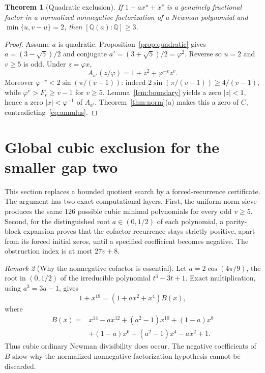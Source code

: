 \documentclass[11pt]{article}
\newtheorem{theorem}{Theorem}[section]
\theoremstyle{remark}
\newtheorem{remark}[theorem]{Remark}
\newcommand{\Q}{\mathbb Q}
\newcommand{\ph}{\varphi}
\numberwithin{equation}{section}
\begin{document}
\begin{theorem}[Quadratic exclusion]\label{thm:noquadratic}
If $1+a x^u+x^v$ is a genuinely fractional factor in a normalized
nonnegative factorization of a Newman polynomial and
$\min\{u,v-u\}=2$, then $[\Q(a):\Q]\ge3$.
\end{theorem}
\begin{proof}
Assume $a$ is quadratic.  Proposition~\ref{prop:quadratic} gives
$a=(3-\sqrt5)/2$ and conjugate $a'=(3+\sqrt5)/2=\ph^2$.  Reverse so $u=2$
and $v\ge5$ is odd.  Under $z=\ph x$,
\[
 A_{a'}(z/\ph)=1+z^2+\ph^{-v}z^v.
\]
Moreover $\ph^{-v}<2\sin(\pi/(v-1))$: indeed
$2\sin(\pi/(v-1))\ge4/(v-1)$, while $\ph^v>F_v\ge v-1$ for $v\ge5$.
Lemma~\ref{lem:boundary} yields a zero $|z|<1$, hence a zero
$|x|<\ph^{-1}$ of $A_{a'}$.  Theorem~\ref{thm:norm}(a) makes this a zero of
$C$, contradicting~\eqref{eq:annulus}.
\end{proof}

\section{Global cubic exclusion for the smaller gap two}
\label{sec:globalcubic}

This section replaces a bounded quotient search by a forced-recurrence
certificate.  The argument has two exact computational layers.  First, the
uniform norm sieve produces the same $126$ possible cubic minimal polynomials
for every odd $v\ge5$.  Second, for the distinguished root $a\in(0,1/2)$ of
each polynomial, a parity-block expansion proves that the cofactor recurrence
stays strictly positive, apart from its forced initial zeros, until a specified
coefficient becomes negative.  The obstruction index is at most $27v+8$.

\begin{remark}[Why the nonnegative cofactor is essential]\label{rem:scopeglobal}
Let $a=2\cos(4\pi/9)$, the root in $(0,1/2)$ of the irreducible polynomial
$t^3-3t+1$.  Exact multiplication, using $a^3=3a-1$, gives
\[
 1+x^{18}=(1+a x^2+x^4)B(x),
\]
where
\begin{align*}
B(x)={}&x^{14}-a x^{12}+(a^2-1)x^{10}+(1-a)x^8\\
      &+(1-a)x^6+(a^2-1)x^4-a x^2+1.
\end{align*}
Thus cubic ordinary Newman divisibility does occur.  The negative coefficients
of $B$ show why the normalized nonnegative-factorization hypothesis cannot be
discarded.
\end{remark}
\end{document}
